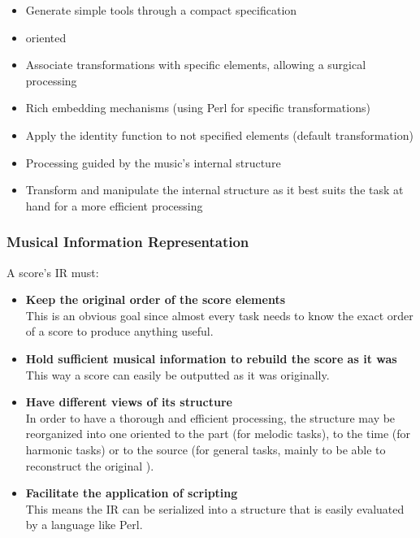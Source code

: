 \begin{itemize}
  \item Generate simple tools through a compact specification
  \item \abc{} oriented
  \item Associate transformations with specific \abc{} elements, allowing a surgical processing
  \item Rich embedding mechanisms (using Perl for specific \abc{} transformations)
  \item Apply the identity function to not specified elements (default transformation)
  \item Processing guided by the music's internal structure
  \item Transform and manipulate the internal structure as it best suits the task at hand for a more
  efficient processing
\end{itemize}

\subsubsection*{Musical Information Representation}

A score's \ac{IR} must:

\begin{itemize}
  \item \textbf{Keep the original order of the score elements} \hfill\\
    This is an obvious goal since almost every task needs to know the exact order of a score to
    produce anything useful.
  \item \textbf{Hold sufficient musical information to rebuild the score as it was} \hfill\\
    This way a score can easily be outputted as it was originally.
  \item \textbf{Have different views of its structure} \hfill\\
    In order to have a thorough and efficient processing, the structure may be reorganized into one
    oriented to the part (for melodic tasks), to the time (for harmonic tasks) or to the source (for
    general tasks, mainly to be able to reconstruct the original \abc{}).
  \item \textbf{Facilitate the application of scripting} \hfill\\
    This means the \ac{IR} can be serialized into a structure that is easily evaluated by a language
    like Perl.
\end{itemize}

